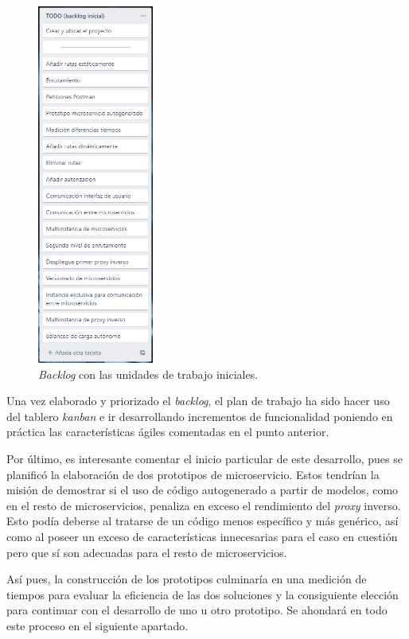 \documentclass[11pt,spanish,listoffigures]{tfgetsinf}
\begin{document}
\begin{figure}[ht]
\centering
\includegraphics[width=0.34\textwidth]{imagenes/backlogInicial}
\caption{\emph{Backlog} con las unidades de trabajo iniciales.}
	\label{kanbanInicial}
\end{figure}

Una vez elaborado y priorizado el \emph{backlog}, el plan de trabajo ha sido hacer uso del tablero \emph{kanban} e ir desarrollando incrementos de funcionalidad poniendo en práctica las características ágiles comentadas en el punto anterior.

Por último, es interesante comentar el inicio particular de este desarrollo, pues se planificó la elaboración de dos prototipos de microservicio. Estos tendrían la misión de demostrar si el uso de código autogenerado a partir de modelos, como en el resto de microservicios, penaliza en exceso el rendimiento del \emph{proxy} inverso. Esto podía deberse al tratarse de un código menos específico y más genérico, así como al poseer un exceso de características innecesarias para el caso en cuestión pero que sí son adecuadas para el resto de microservicios.

Así pues, la construcción de los prototipos culminaría en una medición de tiempos para evaluar la eficiencia de las dos soluciones y la consiguiente elección para continuar con el desarrollo de uno u otro prototipo. Se ahondará en todo este proceso en el siguiente apartado.
\end{document}

